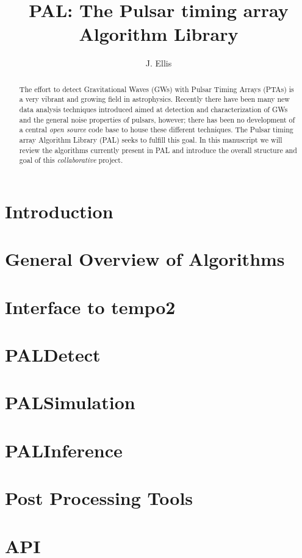 \documentclass[prd,onecolumn]{revtex4}
\begin{document}
\title{PAL: The Pulsar timing array Algorithm Library }


\author{J. Ellis}
 
\begin{abstract}

The effort to detect Gravitational Waves (GWs) with Pulsar Timing Arrays (PTAs) is a very vibrant and growing field in astrophysics. Recently there have been many new data analysis techniques introduced aimed at detection and characterization of GWs and the general noise properties of pulsars, however; there has been no development of a central \emph{open source} code base to house these different techniques. The Pulsar timing array Algorithm Library (PAL) seeks to fulfill this goal. In this manuscript we will review the algorithms currently present in PAL and introduce the overall structure and goal of this \emph{collaborative} project. 

\end{abstract}

\maketitle

\section{Introduction}

\section{General Overview of Algorithms}

\section{Interface to tempo2}

\section{PALDetect}

\section{PALSimulation}

\section{PALInference}

\section{Post Processing Tools}

\section{API}
\end{document}
